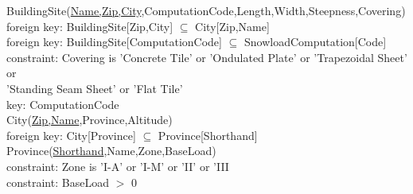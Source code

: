 {{{\color{ForestGreen}BuildingSite(\underline{Name,Zip,City},ComputationCode,Length,Width,Steepness,Covering)}\\
{\color{Orange}\hspace{2mm} foreign key: {\color{Magenta}BuildingSite[Zip,City] $\subseteq$ City[Zip,Name]}} \\
{\color{Orange}\hspace{2mm} foreign key: {\color{Magenta}BuildingSite[ComputationCode] $\subseteq$ SnowloadComputation[Code]}} \\
{\color{Orange}\hspace{2mm} constraint: {\color{Magenta}Covering is 'Concrete Tile' or 'Ondulated Plate' or 'Trapezoidal Sheet' or}} \\
{\color{Magenta}\hspace{19.5mm}'Standing Seam Sheet' or 'Flat Tile'}}\\
{\color{Orange}\hspace{2mm} key: {\color{Magenta}ComputationCode}} \\

{\color{ForestGreen}City(\underline{Zip,Name},Province,Altitude)}\\
{\color{Orange}\hspace{2mm} foreign key: {\color{Magenta}City[Province] $\subseteq$ Province[Shorthand]}} \\

{\color{ForestGreen}Province(\underline{Shorthand},Name,Zone,BaseLoad)}\\
{\color{Orange}\hspace{2mm} constraint: {\color{Magenta}Zone is 'I-A' or 'I-M' or 'II' or 'III}} \\
{\color{Orange}\hspace{2mm} constraint: {\color{Magenta}BaseLoad $>$ 0}} \\

\vspace{12px}

}
